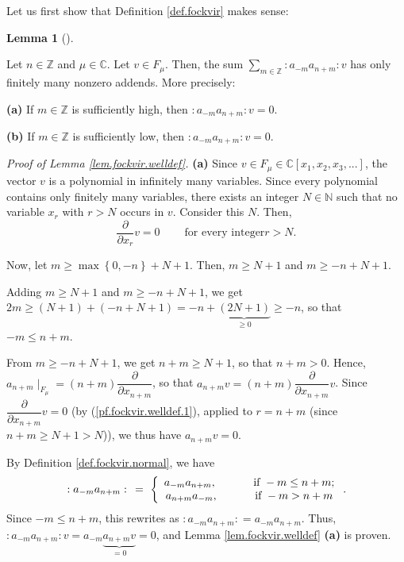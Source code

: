\documentclass
[numbers=enddot,12pt,final,onecolumn,german,notitlepage]{scrartcl}%
\theoremstyle{definition}
\newtheorem{lem}[theo]{Lemma}
\newenvironment{lemma}[1][]
{\begin{lem}[#1]\begin{leftbar}}
{\end{leftbar}\end{lem}}
\begin{document}
Let us first show that Definition \ref{def.fockvir} makes sense:

\begin{lemma}
\label{lem.fockvir.welldef}Let $n\in\mathbb{Z}$ and $\mu\in\mathbb{C}$. Let
$v\in F_{\mu}$. Then, the sum $\sum\limits_{m\in\mathbb{Z}}\left.
:a_{-m}a_{n+m}:\right.  v$ has only finitely many nonzero addends. More precisely:

\textbf{(a)} If $m\in\mathbb{Z}$ is sufficiently high, then $\left.
:a_{-m}a_{n+m}:\right.  v=0$.

\textbf{(b)} If $m\in\mathbb{Z}$ is sufficiently low, then $\left.
:a_{-m}a_{n+m}:\right.  v=0$.
\end{lemma}

\textit{Proof of Lemma \ref{lem.fockvir.welldef}.} \textbf{(a)} Since $v\in
F_{\mu}\in\mathbb{C}\left[  x_{1},x_{2},x_{3},...\right]  $, the vector $v$ is
a polynomial in infinitely many variables. Since every polynomial contains
only finitely many variables, there exists an integer $N\in\mathbb{N}$ such
that no variable $x_{r}$ with $r>N$ occurs in $v$. Consider this $N$. Then,
\begin{equation}
\dfrac{\partial}{\partial x_{r}}v=0\ \ \ \ \ \ \ \ \ \ \text{for every integer
}r>N. \label{pf.fockvir.welldef.1}%
\end{equation}


Now, let $m\geq\max\left\{  0,-n\right\}  +N+1$. Then, $m\geq N+1$ and
$m\geq-n+N+1$.

Adding $m\geq N+1$ and $m\geq-n+N+1$, we get $2m\geq\left(  N+1\right)
+\left(  -n+N+1\right)  =-n+\underbrace{\left(  2N+1\right)  }_{\geq0}\geq-n$,
so that $-m\leq n+m$.

From $m\geq-n+N+1$, we get $n+m\geq N+1$, so that $n+m>0$. Hence, $a_{n+m}%
\mid_{F_{\mu}}=\left(  n+m\right)  \dfrac{\partial}{\partial x_{n+m}}$, so
that $a_{n+m}v=\left(  n+m\right)  \dfrac{\partial}{\partial x_{n+m}}v$. Since
$\dfrac{\partial}{\partial x_{n+m}}v=0$ (by (\ref{pf.fockvir.welldef.1}),
applied to $r=n+m$ (since $n+m\geq N+1>N$)), we thus have $a_{n+m}v=0$.

By Definition \ref{def.fockvir.normal}, we have
\[
\left.  :a_{-m}a_{n+m}:\right.  \ =\ \left\{
\begin{array}
[c]{c}%
a_{-m}a_{n+m},\ \ \ \ \ \ \ \ \ \ \text{if }-m\leq n+m;\\
a_{n+m}a_{-m},\ \ \ \ \ \ \ \ \ \ \text{if }-m>n+m
\end{array}
\right.  .
\]
Since $-m\leq n+m$, this rewrites as $\left.  :a_{-m}a_{n+m}:\right.
=a_{-m}a_{n+m}$. Thus, $\left.  :a_{-m}a_{n+m}:\right.  v=a_{-m}%
\underbrace{a_{n+m}v}_{=0}=0$, and Lemma \ref{lem.fockvir.welldef}
\textbf{(a)} is proven.
\end{document}
